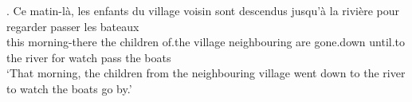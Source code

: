 \documentclass{article}
\begin{document}
\ex. \gll Ce matin-là, les enfants du village voisin sont descendus jusqu'à la rivière pour regarder passer les bateaux\\
          this morning-there the children of.the village neighbouring are gone.down until.to the river for watch pass the boats\\
\glt `That morning, the children from the neighbouring village went down to the river to watch the boats go by.'
\end{document}
